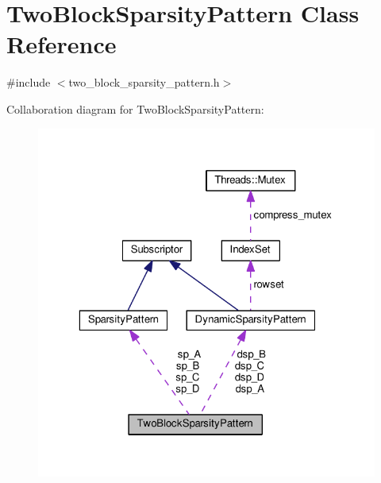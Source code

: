 \hypertarget{class_two_block_sparsity_pattern}{}\section{Two\+Block\+Sparsity\+Pattern Class Reference}
\label{class_two_block_sparsity_pattern}


{\ttfamily \#include $<$two\+\_\+block\+\_\+sparsity\+\_\+pattern.\+h$>$}



Collaboration diagram for Two\+Block\+Sparsity\+Pattern\+:\nopagebreak
\begin{figure}[H]
\begin{center}
\leavevmode
\includegraphics[width=323pt]{class_two_block_sparsity_pattern__coll__graph}
\end{center}
\end{figure}
